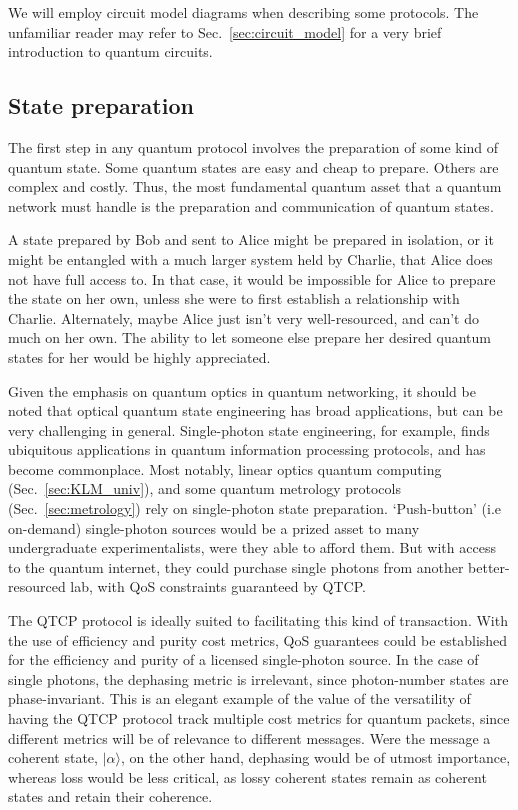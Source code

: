 \documentclass[aps, rmp, twocolumn, amsmath, amssymb, nofootinbib, superscriptaddress, longbibliography, floatfix, table-of-contents, eqsecnum]{revtex4-1}
\newcommand{\ket}[1]{|#1\rangle}
\begin{document}
We will employ circuit model diagrams when describing some protocols. The unfamiliar reader may refer to Sec.~\ref{sec:circuit_model} for a very brief introduction to quantum circuits.

%
%

\subsection{State preparation} 

The first step in any quantum protocol involves the preparation of some kind of quantum state. Some quantum states are easy and cheap to prepare. Others are complex and costly. Thus, the most fundamental quantum asset that a quantum network must handle is the preparation and communication of quantum states.

A state prepared by Bob and sent to Alice might be prepared in isolation, or it might be entangled with a much larger system held by Charlie, that Alice does not have full access to. In that case, it would be impossible for Alice to prepare the state on her own, unless she were to first establish a relationship with Charlie. Alternately, maybe Alice just isn't very well-resourced, and can't do much on her own. The ability to let someone else prepare her desired quantum states for her would be highly appreciated.

Given the emphasis on quantum optics in quantum networking, it should be noted that optical quantum state engineering has broad applications, but can be very challenging in general. Single-photon state engineering, for example, finds ubiquitous applications in quantum information processing protocols, and has become commonplace. Most notably, linear optics quantum computing (Sec.~\ref{sec:KLM_univ}), and some quantum metrology protocols (Sec.~\ref{sec:metrology}) rely on single-photon state preparation. `Push-button' (i.e on-demand) single-photon sources would be a prized asset to many undergraduate experimentalists, were they able to afford them. But with access to the quantum internet, they could purchase single photons from another better-resourced lab, with QoS constraints guaranteed by QTCP.

The QTCP protocol is ideally suited to facilitating this kind of transaction. With the use of efficiency and purity cost metrics, QoS guarantees could be established for the efficiency and purity of a licensed single-photon source. In the case of single photons, the dephasing metric is irrelevant, since photon-number states are phase-invariant. This is an elegant example of the value of the versatility of having the QTCP protocol track multiple cost metrics for quantum packets, since different metrics will be of relevance to different messages. Were the message a coherent state, $\ket\alpha$, on the other hand, dephasing would be of utmost importance, whereas loss would be less critical, as lossy coherent states remain as coherent states and retain their coherence.
\end{document}
